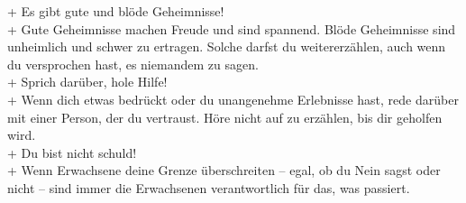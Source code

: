+ Es gibt gute und blöde Geheimnisse! \\[7pt]
+ Gute Geheimnisse machen Freude und sind spannend. Blöde Geheimnisse sind
\noindent\hspace*{2mm} unheimlich und schwer zu ertragen. Solche darfst du weitererzählen, auch wenn
\noindent\hspace*{2mm} du versprochen hast, es niemandem zu sagen. \\[7pt]
+ Sprich darüber, hole Hilfe! \\[7pt]
+ Wenn dich etwas bedrückt oder du unangenehme Erlebnisse hast, rede darüber
\noindent\hspace*{2mm} mit einer Person, der du vertraust. Höre nicht auf zu erzählen, bis dir geholfen wird. \\[7pt]
+ Du bist nicht schuld! \\[7pt]
+ Wenn Erwachsene deine Grenze überschreiten – egal, ob du Nein sagst oder nicht
\noindent\hspace*{2mm} – sind immer die Erwachsenen verantwortlich für das, was passiert.